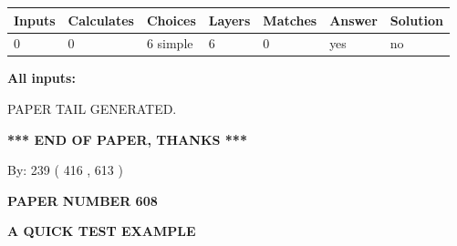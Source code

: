 \documentclass[12pt]{article}
\begin{document}
 
\noindent{}
 
 
   
   
   
   
\noindent\begin{tabular}{|l|l|l|l|l|l|l|}
 \hline
Inputs & Calculates & Choices & Layers & Matches & Answer & Solution \\ \hline
 0  & 
 0  & 
 6
  simple  
  & 
 6  & 
 0  & 
  yes & 
  no 
  \\ \hline
 \end{tabular}
   
   
   
   
\noindent{}
   
   
   
   
\noindent\vspace{0.1in}\hspace{-0.08in} {\textbf{\Large{All inputs: }}}
   
   
   
   
   
   
 \vspace{0.2in}
 
   
   
\vspace{2.0in} PAPER TAIL GENERATED.
   
   
   
   
\vspace{1.0in} 
{\textbf{\large{ *** END OF PAPER, THANKS *** }}} 
   
   
\hspace{1.0in} By: 
 239 ( 416 ,  613 )
   
   
   
   
\newpage 
\setcounter{page}{ 
   608001 } 
   
   
   
   
 {\textbf{ \Large{ PAPER NUMBER  608  }}}
   
   
\vspace{0.2in}
   
   
   
   
   
   
   
   
 \vspace{0.2in}
{\LARGE {\textbf{ A QUICK TEST EXAMPLE}}}
   
\end{document}
